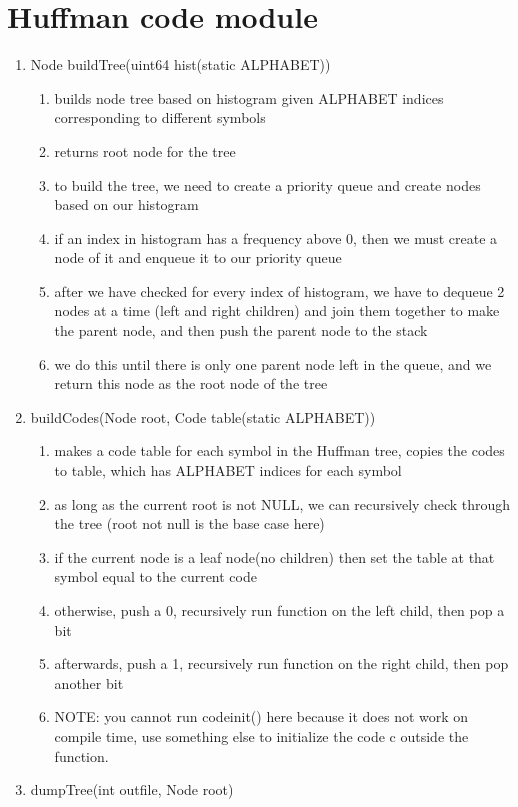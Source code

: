\documentclass[11pt]{article}
\begin{document}
\section{Huffman code module}\label{ss:module}
\begin{enumerate}
\item Node buildTree(uint64 hist(static ALPHABET))
	\begin{enumerate}
	\item builds node tree based on histogram given ALPHABET indices corresponding to different symbols
	\item returns root node for the tree
	\item to build the tree, we need to create a priority queue and create nodes based on our histogram
	\item if an index in histogram has a frequency above 0, then we must create a node of it and enqueue it to our priority queue
	\item after we have checked for every index of histogram, we have to dequeue 2 nodes at a time (left and right children) and join them together to make the parent node, and then push the parent node to the stack
	\item we do this until there is only one parent node left in the queue, and we return this node as the root node of the tree
	\end{enumerate}
\item buildCodes(Node root, Code table(static ALPHABET))
	\begin{enumerate}
	\item makes a code table for each symbol in the Huffman tree, copies the codes to table, which has ALPHABET indices for each symbol
	\item as long as the current root is not NULL, we can recursively check through the tree (root not null is the base case here)
	\item if the current node is a leaf node(no children) then set the table at that symbol equal to the current code
	\item otherwise, push a 0, recursively run function on the left child, then pop a bit
	\item afterwards, push a 1, recursively run function on the right child, then pop another bit
	\item NOTE: you cannot run codeinit() here because it does not work on compile time, use something else to initialize the code c outside the function.
	\end{enumerate}
\item dumpTree(int outfile, Node root)

\end{enumerate}
\end{document}
